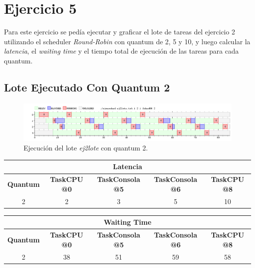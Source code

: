 \section{Ejercicio 5}


Para este ejercicio se pedía ejecutar y graficar el lote de tareas del ejercicio 2 utilizando el scheduler \emph{Round-Robin} con quantum de 2, 5 y 10, y luego calcular la \textit{latencia}, el \textit{waiting time} y el tiempo total de ejecución de las tareas para cada quantum.

\subsection{Lote Ejecutado Con Quantum 2}

\begin{figure}[!h]
	\begin{center}
		\includegraphics[width=500px]{imagenes/ej5_2.png}
		\caption{Ejecución del lote \emph{ej2lote} con quantum 2.}
		\label{fig:grafico_ej5_2}
	\end{center}
\end{figure}

\begin{center}
	\begin{tabular}{|c|c|c|c|c|}
		\hline
		\multicolumn{5}{|c|}{\large{\textbf{Latencia}}} \\
		\hline
		\textbf{Quantum} & \textbf{TaskCPU @0} & \textbf{TaskConsola @5} & \textbf{TaskConsola @6} & \textbf{TaskCPU @8} \\
		\hline
		2 & 2 & 3 & 5 & 10 \\
		\hline
	\end{tabular}
\end{center}

\begin{center}
	\begin{tabular}{|c|c|c|c|c|}
		\hline
		\multicolumn{5}{|c|}{\large{\textbf{Waiting Time}}} \\
		\hline
		\textbf{Quantum} & \textbf{TaskCPU @0} & \textbf{TaskConsola @5} & \textbf{TaskConsola @6} & \textbf{TaskCPU @8} \\
		\hline
		2 & 38 & 51 & 59 & 58 \\
		\hline
	\end{tabular}
\end{center}


